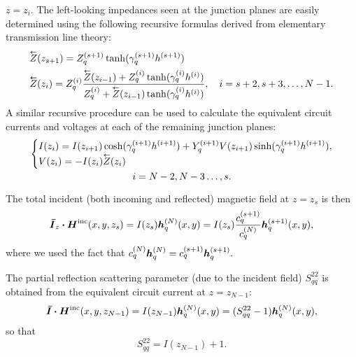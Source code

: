 $z=z_i$.  The left-looking impedances seen at the junction planes
are easily determined using the following recursive
formulas derived from elementary transmission line theory:
\begin{subequations}
  \begin{align}
    &\Zleft(z_{s+1}) = Z_{q}^{(s+1)} \tanh(\gamma_{q}^{(s+1)} h^{(s+1)}) \\
    &\Zleft(z_i) = Z_{q}\eye 
    \frac%
    {\Zleft(z_{i-1}) + Z_{q}\eye \tanh(\gamma_{q}\eye h\eye)}%
    {Z_{q}\eye + \Zleft(z_{i-1})\tanh(\gamma_{q}\eye h\eye)}, \quad
     i = s+2,s+3,\ldots,N-1.
  \end{align}
\end{subequations}
A similar recursive procedure can be used to calculate the 
equivalent circuit currents and voltages at each of the remaining
junction planes:
\begin{multline}
  \left\{
    \begin{array}{@{}l@{}}
      \displaystyle
      I(z_i) = I(z_{i+1}) \cosh (\gamma_{q}\epw h\epw)
      + Y_q\epw
      V(z_{i+1}) \sinh ( \gamma_{q}\epw h\epw ), \\
      \displaystyle
      V(z_i) = -I(z_i) \Zleft(z_i)
    \end{array}
  \right.
  \\
  i = N-2,N-3\ldots,s. 
  \label{eq:Mrecurseleft}
\end{multline}

The total incident (both incoming and reflected) magnetic field at
$z=z_s$ is then
\begin{equation}
  \boldsymbol{\bar{I}}_z \boldsymbol{\cdot} \boldsymbol{H}^{\text{inc}}(x,y,z_s) = I(z_s) \boldsymbol{h}_q^{(N)}(x,y)
  = I(z_s) \frac{c_q^{(s+1)}}{c_q^{(N)}} \boldsymbol{h}_q^{(s+1)}(x,y),
\end{equation}
where we used the fact that $ c_q^{(N)} \boldsymbol{h}_q^{(N)} = c_q^{(s+1)} \boldsymbol{h}_q^{(s+1)}.$

The partial reflection scattering parameter (due to the incident
field) $S^{22}_{qq}$ is obtained from the equivalent circuit current
at $z=z_{N-1}$:
\begin{equation}
  \boldsymbol{\bar{I}} \boldsymbol{\cdot} \boldsymbol{H}^{\text{inc}}(x,y,z_{N-1}) = I(z_{N-1}) \boldsymbol{h}_q^{(N)}(x,y) 
  = (S^{22}_{qq} - 1) \boldsymbol{h}_q^{(N)}(x,y),
\end{equation}
so that
\begin{equation}
  S^{22}_{qq} = I(z_{N-1}) + 1.
\end{equation}

